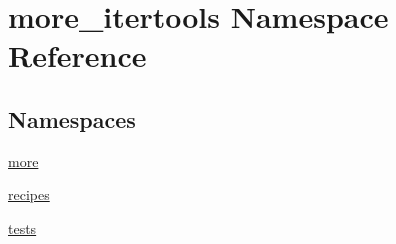 \hypertarget{namespacemore__itertools}{}\section{more\+\_\+itertools Namespace Reference}
\label{namespacemore__itertools}
\subsection*{Namespaces}
\begin{DoxyCompactItemize}
\item 
 \hyperlink{namespacemore__itertools_1_1more}{more}
\item 
 \hyperlink{namespacemore__itertools_1_1recipes}{recipes}
\item 
 \hyperlink{namespacemore__itertools_1_1tests}{tests}
\end{DoxyCompactItemize}
